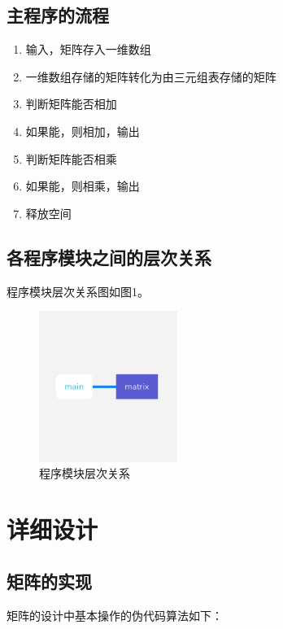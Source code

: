 \documentclass{article}
\begin{document}
\subsection{主程序的流程}

\begin{enumerate}
    \item 输入，矩阵存入一维数组
    \item 一维数组存储的矩阵转化为由三元组表存储的矩阵
    \item 判断矩阵能否相加
    \item 如果能，则相加，输出
    \item 判断矩阵能否相乘
    \item 如果能，则相乘，输出
    \item 释放空间
\end{enumerate}

\subsection{各程序模块之间的层次关系}

程序模块层次关系图如图1。

\begin{figure}[htbp]

    \centering\includegraphics[width=0.4\textwidth]{./Images/pic3_1.png}

    \caption{程序模块层次关系}

\end{figure}

\section{详细设计}

\subsection{矩阵的实现}

矩阵的设计中基本操作的伪代码算法如下：
\end{document}
